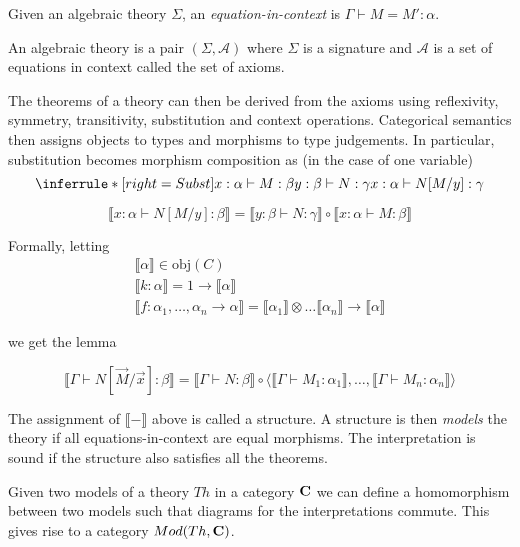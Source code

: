 \documentclass[acmsmall,screen, nonacm, anonymous]{acmart}
\begin{document}
Given an algebraic theory $\Sigma$, an \textit{equation-in-context} is $\Gamma \vdash M = M' : \alpha$.

\begin{definition}

An algebraic theory is a pair $(\Sigma, \mathcal{A})$ where $\Sigma$ is a signature and $\mathcal{A}$ is a set of equations in context called the set of axioms.
\end{definition}

The theorems of a theory can then be derived from the axioms using reflexivity, symmetry, transitivity, substitution and context operations.
Categorical semantics then assigns objects to types and morphisms to type judgements.
In particular, substitution becomes morphism composition as (in the case of one variable)
\[
\inferrule*[right=Subst]
  { x : \alpha \vdash M : \beta  \\ y : \beta \vdash N : \gamma }
  { x : \alpha \vdash N[M / y] : \gamma }
\]

\[
\llbracket x : \alpha \vdash N[M / y] : \beta \rrbracket =  \llbracket y : \beta \vdash N : \gamma \rrbracket \circ \llbracket x : \alpha \vdash M : \beta \rrbracket
\]

Formally, letting 
\begin{align*}
\llbracket \alpha \rrbracket \in \text{obj}(C)\\
\llbracket k : \alpha \rrbracket = 1 \to \llbracket \alpha \rrbracket\\
\llbracket f : \alpha_1, \ldots, \alpha_n \to \alpha  \rrbracket = \llbracket \alpha_1 \rrbracket \otimes \ldots \llbracket \alpha_n \rrbracket \to \llbracket \alpha \rrbracket
\end{align*}

we get the lemma 

\begin{lemma}
\[
\llbracket \Gamma \vdash N[\vec{M} / \vec{x}] : \beta \rrbracket = \llbracket \Gamma \vdash N : \beta \rrbracket \circ \langle \llbracket \Gamma \vdash M_{1} : \alpha_{1} \rrbracket, \ldots, \llbracket \Gamma \vdash M_{n} : \alpha_{n} \rrbracket \rangle
\]

\end{lemma}

The assignment of $\llbracket - \rrbracket$ above is called a structure.
A structure is then \textit{models} the theory if all equations-in-context are equal morphisms.
The interpretation is sound if the structure also satisfies all the theorems.

\begin{definition}
  Given two models of a theory $Th$ in a category $\mathbf{C}$ we can define a homomorphism between two models such that diagrams for the interpretations commute.
  This gives rise to a category $Mod(Th,\mathbf{C})$.  
\end{definition}
\end{document}

